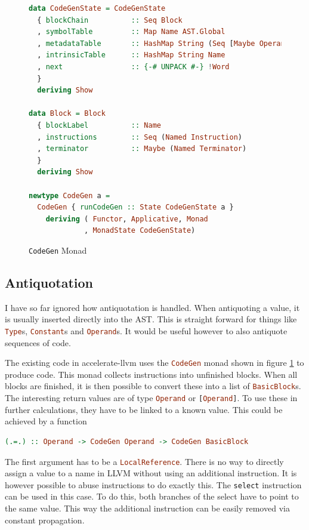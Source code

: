 \documentclass[a4paper,bibliography=totocnumbered,parskip,headsepline]{scrbook}
\begin{document}
\begin{figure}[h]
\begin{lstlisting}[language=haskell]
data CodeGenState = CodeGenState
  { blockChain          :: Seq Block
  , symbolTable         :: Map Name AST.Global
  , metadataTable       :: HashMap String (Seq [Maybe Operand])
  , intrinsicTable      :: HashMap String Name
  , next                :: {-# UNPACK #-} !Word
  }
  deriving Show

data Block = Block
  { blockLabel          :: Name
  , instructions        :: Seq (Named Instruction)
  , terminator          :: Maybe (Named Terminator)
  }
  deriving Show

newtype CodeGen a =
  CodeGen { runCodeGen :: State CodeGenState a }
    deriving ( Functor, Applicative, Monad
             , MonadState CodeGenState)
\end{lstlisting}
\caption{\lstinline!CodeGen! Monad}
\label{fig:codegen}
\end{figure}

\subsection{Antiquotation}
I have so far ignored how antiquotation is handled.
When antiquoting a value, it is usually inserted directly into the AST.
This is straight forward for things like \lstinline[language=haskell]!Type!s, \lstinline[language=haskell]!Constant!s and \lstinline[language=haskell]!Operand!s.
It would be useful however to also antiquote sequences of code.

The existing code in accelerate-llvm uses the \lstinline[language=haskell]!CodeGen! monad shown in figure \ref{fig:codegen} to produce code.
This monad collects instructions into unfinished blocks.
When all blocks are finished, it is then possible to convert these into a list of \lstinline[language=haskell]!BasicBlock!s.
The interesting return values are of type \lstinline[language=haskell]!Operand! or \lstinline[language=haskell]![Operand]!.
To use these in further calculations, they have to be linked to a known value.
This could be achieved by a function
\begin{lstlisting}[language=haskell]
(.=.) :: Operand -> CodeGen Operand -> CodeGen BasicBlock
\end{lstlisting}
The first argument has to be a \lstinline[language=haskell]!LocalReference!.
There is no way to directly assign a value to a name in LLVM without using an additional instruction.
It is however possible to abuse instructions to do exactly this.
The \lstinline!select! instruction can be used in this case.
To do this, both branches of the select have to point to the same value.
This way the additional instruction can be easily removed via constant propagation.
\end{document}
